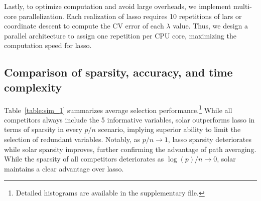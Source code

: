 \documentclass[11pt,review,authoryear]{elsarticle}
\begin{document}
Lastly, to optimize computation and avoid large overheads, we implement multi-core parallelization. Each realization of lasso requires 10 repetitions of lars or coordinate descent to compute the CV error of each $\lambda$ value. Thus, we design a parallel architecture to assign one repetition per CPU core, maximizing the computation speed for lasso.

\subsection{Comparison of sparsity, accuracy, and time complexity \label{subsection:suml1}}

Table~\ref{table:sim_1} summarizes average selection performance.\footnote{Detailed histograms are available in the supplementary file.} While all competitors always include the 5 informative variables, solar outperforms lasso in terms of sparsity in every $p/n$ scenario, implying superior ability to limit the selection of redundant variables. Notably, as $p/n\rightarrow1$, lasso sparsity deteriorates while solar sparsity improves, further confirming the advantage of path averaging. While the sparsity of all competitors deteriorates as $\log(p)/n\rightarrow0$, solar maintains a clear advantage over lasso.
\end{document}
